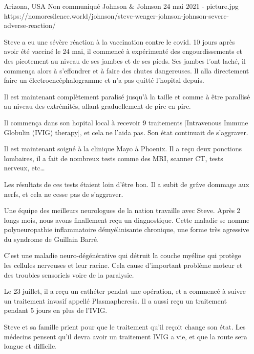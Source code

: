 {Arizona, USA}
{Non communiqué}
{Johnson \& Johnson}
{24 mai 2021}
{-}
{picture.jpg}
{https://nomoresilence.world/johnson/steve-wenger-johnson-johnson-severe-adverse-reaction/}
{

Steve a eu une sévère réaction à la vaccination contre le covid. 10 jours après
avoir été vacciné le 24 mai, il commencé à expérimenté des engourdissements et
des picotement au niveau de ses jambes et de ses pieds. Ses jambes l'ont laché,
il commença alors à s'effondrer et à faire des chutes dangereuses. Il alla
directement faire un électroencéphalogramme et n'a pas quitté l'hopital depuis.

Il est maintenant complètement paralisé jusqu'à la taille et comme à être
parallisé au niveau des extrémités, allant graduellement de pire en pire.

Il commença dans son hopital local à recevoir 9 traitements [Intravenous Immune
  Globulin (IVIG) therapy], et cela ne l'aida pas. Son état continuait de
s'aggraver.

Il est maintenant soigné à la clinique Mayo à Phoenix. Il a reçu deux ponctions
lombaires, il a fait de nombreux tests comme des MRI, scanner CT, tests nerveux,
etc…

Les résultats de ces tests étaient loin d'être bon. Il a subit de grâve dommage
aux nerfs, et cela ne cesse pas de s'aggraver.

Une équipe des meilleurs neurologues de la nation travaille avec Steve. Après 2
longs mois, nous avons finallement reçu un diagnostique. Cette maladie se nomme
polyneuropathie inflammatoire démyélinisante chronique, une forme très agressive
du syndrome de Guillain Barré.

C'est une maladie neuro-dégénérative qui détruit la couche myéline qui protège
les cellules nerveuses et leur racine. Cela cause d'important problème moteur et
des troubles sensoriels voire de la paralysie.

Le 23 juillet, il a reçu un cathéter pendat une opération, et a commencé à
suivre un traitement invasif appellé Plasmapheresis. Il a aussi reçu un
traitement pendant 5 jours en plus de l'IVIG.

Steve et sa famille prient pour que le traitement qu'il reçoit change son
état. Les médecins pensent qu'il devra avoir un traitement IVIG a vie, et que la
route sera longue et difficile.

}
